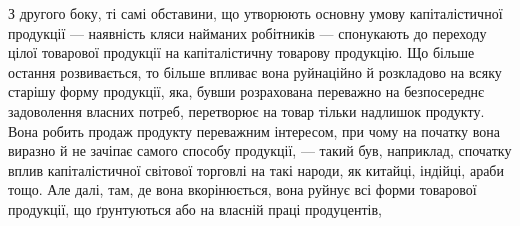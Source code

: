 З другого боку, ті самі обставини, що утворюють основну умову капіталістичної продукції — наявність
кляси найманих робітників — спонукають до переходу цілої товарової продукції на капіталістичну
товарову продукцію. Що більше остання розвивається, то більше впливає вона руйнаційно й розкладово
на всяку старішу форму продукції, яка, бувши розрахована переважно на безпосереднє задоволення
власних потреб, перетворює на товар тільки надлишок продукту. Вона робить продаж продукту
переважним інтересом, при чому на початку вона виразно й не зачіпає самого способу продукції, —
такий був, наприклад, спочатку вплив капіталістичної світової торговлі на такі народи, як китайці,
індійці, араби тощо. Але далі, там, де вона вкорінюється, вона руйнує всі форми товарової продукції,
що ґрунтуються або на власній праці продуцентів,
\parbreak{}  %
